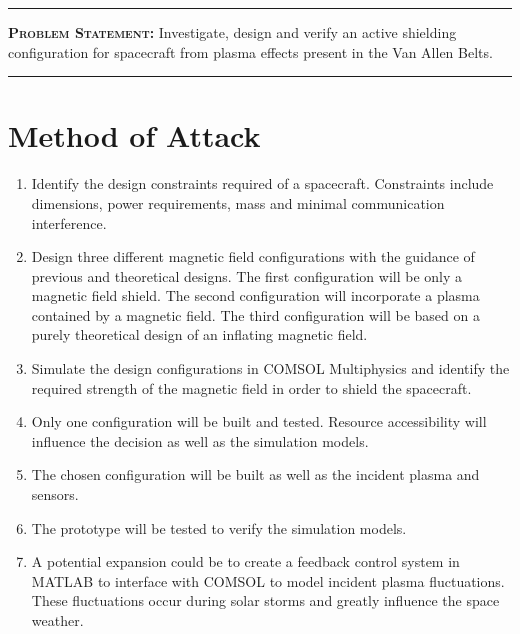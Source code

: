 \documentclass[12pt,a4paper]{article}
\begin{document}
\vspace{12pt}
\hrule
\vspace{3mm}
\noindent\textbf{\scshape\Large\color{scolour}Problem Statement:} Investigate, design and verify an active shielding configuration for spacecraft from plasma effects present in the Van Allen Belts. 
\vspace{3mm}
\hrule



\section*{Method of Attack}
\begin{enumerate}
\item Identify the design constraints required of a spacecraft. Constraints include dimensions, power requirements, mass and minimal communication interference.
\item Design three different magnetic field configurations with the guidance of previous and theoretical designs. The first configuration will be only a magnetic field shield. The second configuration will incorporate a plasma contained by a magnetic field. The third configuration will be based on a purely theoretical design of an inflating magnetic field.
\item Simulate the design configurations in COMSOL Multiphysics and identify the required strength of the magnetic field in order to shield the spacecraft. 
\item Only one configuration will be built and tested. Resource accessibility will influence the decision as well as the simulation models.
\item The chosen configuration will be built as well as the incident plasma and sensors.
\item The prototype will be tested to verify the simulation models.
\item A potential expansion could be to create a feedback control system in MATLAB to interface with COMSOL to model incident plasma fluctuations. These fluctuations occur during solar storms and greatly influence the space weather.  
\end{enumerate}
\end{document}
